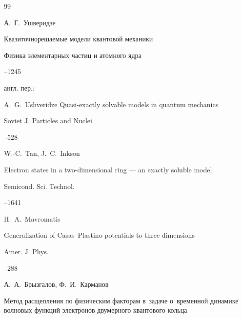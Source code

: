 \begin{thebibliography}{99}




\by А.~Г.~Ушверидзе

\paper Квазиточнорешаемые модели квантовой  механики

\jour Физика элементарных частиц и атомного ядра




--1245

\transl англ. пер.:~

\by A.~G.~Ushveridze Quasi-exactly solvable models in quantum mechanics

\jour Soviet J. Particles and Nuclei 




–528 






\by W.-C.~Tan, J.~C.~Inkson

\paper Electron states in a two-dimensional ring — an exactly soluble model

\jour Semicond. Sci. Technol.




--1641




\by H.~A.~Mavromatis

\paper Generalization of Casas--Plastino potentials to three dimensions

\jour Amer. J. Phys. 



--288





\by А.~А.~Брызгалов, Ф.~И.~Карманов

\paper Метод расщепления по физическим факторам в~задаче о~временной динамике волновых функций электронов двумерного квантового кольца


\end{thebibliography}
